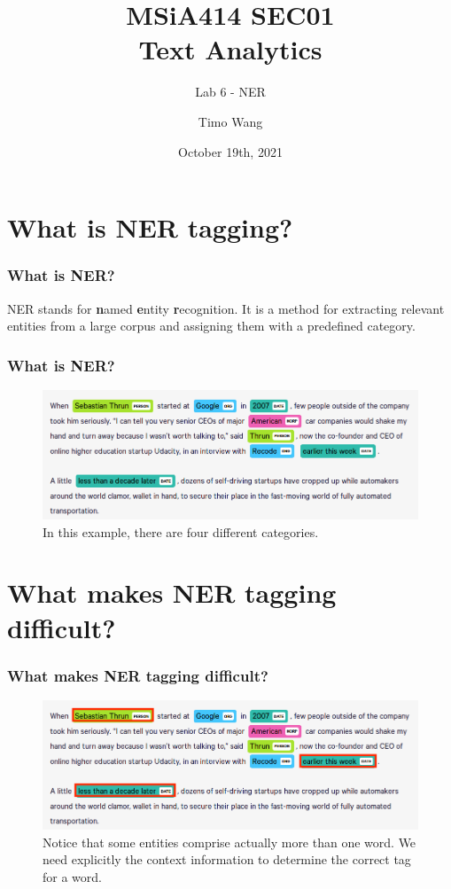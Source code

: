 \documentclass{beamer}
\begin{document}
\title{MSiA414 SEC01\\ Text Analytics}
\subtitle{Lab 6 - NER}
\author{Timo Wang}
\date{October 19th, 2021}

\begin{frame}
    \titlepage
\end{frame}


\section{What is NER tagging?}
\begin{frame}
    \frametitle{What is NER?}
    NER stands for \textbf{n}amed \textbf{e}ntity \textbf{r}ecognition. It is a method for extracting relevant entities from a large corpus and assigning them with a predefined category.
\end{frame}

\begin{frame}
    \frametitle{What is NER?}
    \begin{figure}
        \includegraphics[scale=0.3]{ner_example}
        \caption{In this example, there are four different categories.}
    \end{figure}
\end{frame}


\section{What makes NER tagging difficult?}
\begin{frame}
    \frametitle{What makes NER tagging difficult?}
    \begin{figure}
        \includegraphics[scale=0.3]{ner_example_difficult}
        \caption{Notice that some entities comprise actually more than one word. We need explicitly the context information to determine the correct tag for a word.}
    \end{figure}
\end{frame}
\end{document}
